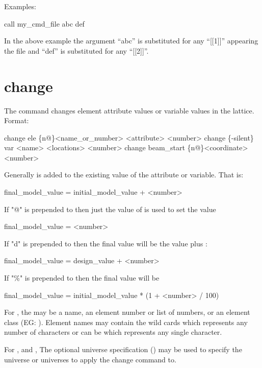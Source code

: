 Examples:
\begin{example}
    call my_cmd_file abc def 
\end{example}
In the above example the argument ``abc'' is substituted for any
``[[1]]'' appearing the file and ``def'' is substituted for any
``[[2]]''.
\Newline

\section{change}
\label{s:change}

The  command changes element attribute values or variable
values in the  lattice. Format:
\begin{example}
  change ele \{n@\}<name_or_number> <attribute> <number>
  change \{-silent\} var <name> <locations> <number>
  change  beam_start \{n@\}<coordinate> <number>
\end{example}

\vskip 0.2in 
Generally  is added to the existing value of the
attribute or variable. That is:
\begin{example}
  final_model_value = initial_model_value + <number>
\end{example}
If "@" is prepended to  then just the value of
 is used to set the value
\begin{example}
  final_model_value = <number>
\end{example}
If "d" is prepended to  then the final value will be the
 value plus :
\begin{example}
  final_model_value = design_value + <number>
\end{example}
If "\%" is prepended to  then the final value will be
\begin{example}
  final_model_value = initial_model_value * (1 + <number> / 100)
\end{example}

For , the  may be a name, an element number or
list of numbers, or an element class (EG: ). Element names
may contain the wild cards  which represents any number of characters
or can be  which represents any single character. 

For , and , The optional 
universe specification () may be used to specify the
universe or universes to apply the change command to.


